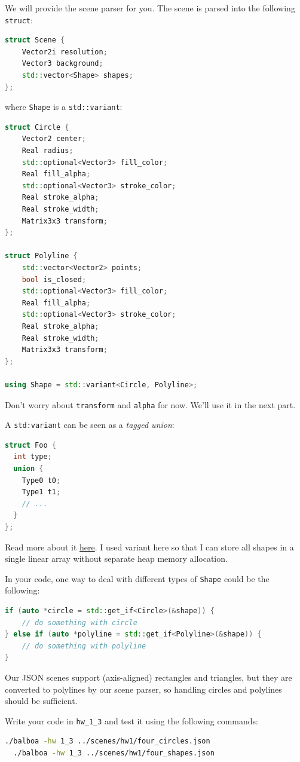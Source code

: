 We will provide the scene parser for you. The scene is parsed into the following \lstinline{struct}:
\begin{lstlisting}[language=C++]
struct Scene {
    Vector2i resolution;
    Vector3 background;
    std::vector<Shape> shapes;
};
\end{lstlisting}
where \lstinline{Shape} is a \lstinline{std::variant}:
\begin{lstlisting}[language=C++]
struct Circle {
    Vector2 center;
    Real radius;
    std::optional<Vector3> fill_color;
    Real fill_alpha;
    std::optional<Vector3> stroke_color;
    Real stroke_alpha;
    Real stroke_width;
    Matrix3x3 transform;
};

struct Polyline {
    std::vector<Vector2> points;
    bool is_closed;
    std::optional<Vector3> fill_color;
    Real fill_alpha;
    std::optional<Vector3> stroke_color;
    Real stroke_alpha;
    Real stroke_width;
    Matrix3x3 transform;
};

using Shape = std::variant<Circle, Polyline>;
\end{lstlisting}

Don't worry about \lstinline{transform} and \lstinline{alpha} for now. We'll use it in the next part.

A \lstinline{std:variant} can be seen as a \emph{tagged union}:
\begin{lstlisting}[language=C++]
struct Foo {
  int type;
  union {
    Type0 t0;
    Type1 t1;
    // ...
  }
};
\end{lstlisting}
Read more about it \href{https://www.cppstories.com/2020/04/variant-virtual-polymorphism.html/}{here}. I used variant here so that I can store all shapes in a single linear array without separate heap memory allocation.

In your code, one way to deal with different types of \lstinline{Shape} could be the following:
\begin{lstlisting}[language=C++]
if (auto *circle = std::get_if<Circle>(&shape)) {
    // do something with circle
} else if (auto *polyline = std::get_if<Polyline>(&shape)) {
    // do something with polyline
}
\end{lstlisting}
Our JSON scenes support (axis-aligned) rectangles and triangles, but they are converted to polylines by our scene parser, so handling circles and polylines should be sufficient.

Write your code in \lstinline{hw_1_3} and test it using the following commands:
\begin{lstlisting}[language=bash]
  ./balboa -hw 1_3 ../scenes/hw1/four_circles.json
  ./balboa -hw 1_3 ../scenes/hw1/four_shapes.json
\end{lstlisting}

